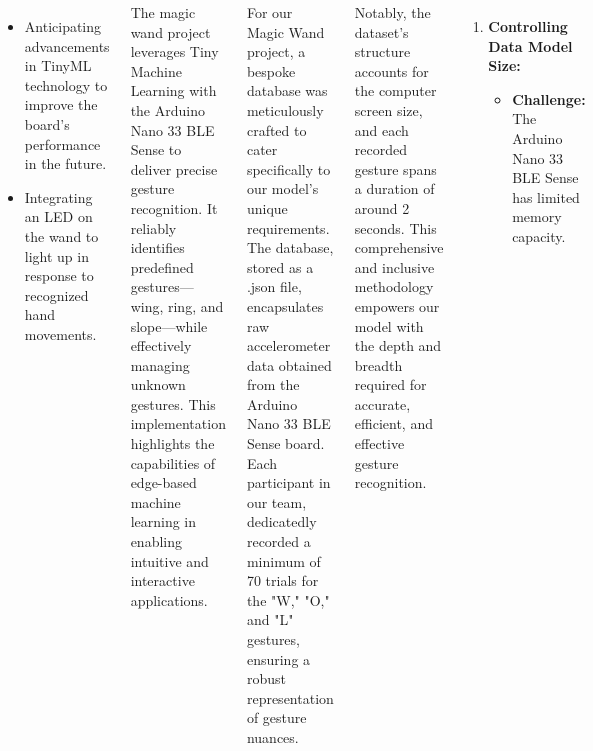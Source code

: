 \documentclass[25pt,a0paper, portrait]{tikzposter}
\begin{document}
\begin{columns}
{{\begin{itemize}
					\item Anticipating advancements in TinyML technology to improve the board's performance in the future.
					
					\item Integrating an LED on the wand to light up in response to recognized hand movements.
					
				\end{itemize}
				
			}
	
			{	
				The magic wand project leverages Tiny Machine Learning with the Arduino Nano 33 BLE Sense to deliver precise gesture recognition. It reliably identifies predefined gestures—wing, ring, and slope—while effectively managing unknown gestures. This implementation highlights the capabilities of edge-based machine learning in enabling intuitive and interactive applications.
			}

		}
		
		{
		
			{
			
				For our Magic Wand project, a bespoke database was meticulously crafted to cater specifically to our model's unique requirements. The database, stored as a .json file, encapsulates raw accelerometer data obtained from the Arduino Nano 33 BLE Sense board. Each participant in our team, dedicatedly recorded a minimum of 70 trials for the "W," "O," and "L" gestures, ensuring a robust representation of gesture nuances.
				
			    Notably, the dataset's structure accounts for the computer screen size, and each recorded gesture spans a duration of around 2 seconds. This comprehensive and inclusive methodology empowers our model with the depth and breadth required for accurate, efficient, and effective gesture recognition.
		    
			}
	
			{
		
				\begin{enumerate}
					
					\item \textbf{Controlling Data Model Size:}
					
					\begin{itemize}
						
						\item \textbf{Challenge:} The Arduino Nano 33 BLE Sense has limited memory capacity.
						

\end{itemize}
\end{enumerate}}}
\end{columns}
\end{document}

